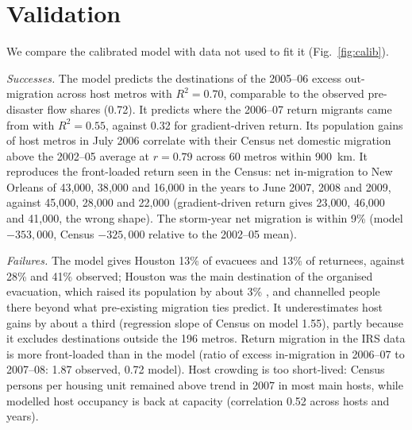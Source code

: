 \documentclass[11pt]{article}
\begin{document}
\section{Validation}\label{sec:valid}

We compare the calibrated model with data not used to fit it (Fig.~\ref{fig:calib}).

\emph{Successes.} The model predicts the destinations of the 2005--06 excess out-migration across host metros with $R^2=0.70$, comparable to the observed pre-disaster flow shares (0.72). It predicts where the 2006--07 return migrants came from with $R^2=0.55$, against 0.32 for gradient-driven return. Its population gains of host metros in July 2006 correlate with their Census net domestic migration above the 2002--05 average at $r=0.79$ across 60 metros within 900~km. It reproduces the front-loaded return seen in the Census: net in-migration to New Orleans of 43{,}000, 38{,}000 and 16{,}000 in the years to June 2007, 2008 and 2009, against 45{,}000, 28{,}000 and 22{,}000 (gradient-driven return gives 23{,}000, 46{,}000 and 41{,}000, the wrong shape). The storm-year net migration is within 9\% (model $-353{,}000$, Census $-325{,}000$ relative to the 2002--05 mean).

\emph{Failures.} The model gives Houston 13\% of evacuees and 13\% of returnees, against 28\% and 41\% observed; Houston was the main destination of the organised evacuation, which raised its population by about 3\% \citep{McIntosh2008}, and channelled people there beyond what pre-existing migration ties predict. It underestimates host gains by about a third (regression slope of Census on model 1.55), partly because it excludes destinations outside the 196 metros. Return migration in the IRS data is more front-loaded than in the model (ratio of excess in-migration in 2006--07 to 2007--08: 1.87 observed, 0.72 model). Host crowding is too short-lived: Census persons per housing unit remained above trend in 2007 in most main hosts, while modelled host occupancy is back at capacity (correlation 0.52 across hosts and years).
\end{document}
